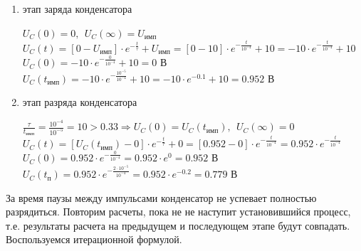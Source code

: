 \begin{enumerate}
\item этап заряда конденсатора

	$U_C(0) = 0,\ \ U_C(\infty) = U_\text{имп}$\\	
	$U_C(t) = [0 - U_\text{имп}] \cdot e^{-\frac{t}{\tau}} + U_\text{имп} = [0 - 10] \cdot e^{-\frac{t}{10^{-4}}} + 10 = -10 \cdot e^{-\frac{t}{10^{-4}}} + 10$\\
	$U_C(0) = -10 \cdot e^{-\frac{0}{10^{-4}}} + 10 = 0 \text{ В}$\\
	$U_C(t_\text{имп}) = -10 \cdot e^{-\frac{10^{-5}}{10^{-4}}} + 10 = -10 \cdot e^{-0.1} + 10 = 0.952 \text{ В}$
	
\item этап разряда конденсатора

	$\frac{\tau}{t_\text{имп}} = \frac{10^{-4}}{10^{-5}} = 10 > 0.33 \Rightarrow U_C(0) = U_C(t_\text{имп}),\ \ U_C(\infty) = 0$\\
	$U_C(t) = [U_C(t_\text{имп}) - 0] \cdot e^{-\frac{t}{\tau}} + 0 =  [0.952 - 0] \cdot e^{-\frac{t}{10^{-4}}} = 0.952 \cdot e^{-\frac{t}{10^{-4}}}$\\
	$U_C(0) = 0.952 \cdot e^{-\frac{0}{10^{-4}}} = 0.952 \cdot e^0 = 0.952 \text{ В}$\\
	$U_C(t_\text{п}) = 0.952 \cdot e^{-\frac{ 2 \cdot 10^{-5}}{10^{-4}}} = 0.952 \cdot e^{-0.2} = 0.779 \text{ В}$
\end{enumerate}				
		
За время паузы между импульсами конденсатор не успевает полностью разрядиться. Повторим расчеты, пока не не наступит установившийся процесс, т.е. результаты расчета на предыдущем и последующем этапе будут совпадать.	Воспользуемся итерационной формулой.

